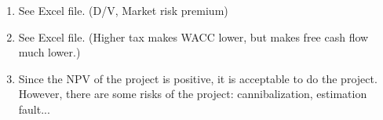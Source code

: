 \documentclass{article}
\begin{document}
\begin{enumerate}
	\item
	See Excel file. (D/V, Market risk premium)
	\item
	See Excel file. (Higher tax makes WACC lower, but makes free cash flow much lower.)
	\item
	Since the NPV of the project is positive, it is acceptable to do the project. However, there are some risks of the project: cannibalization, estimation fault...
	\end{enumerate}
	
\end{document}

